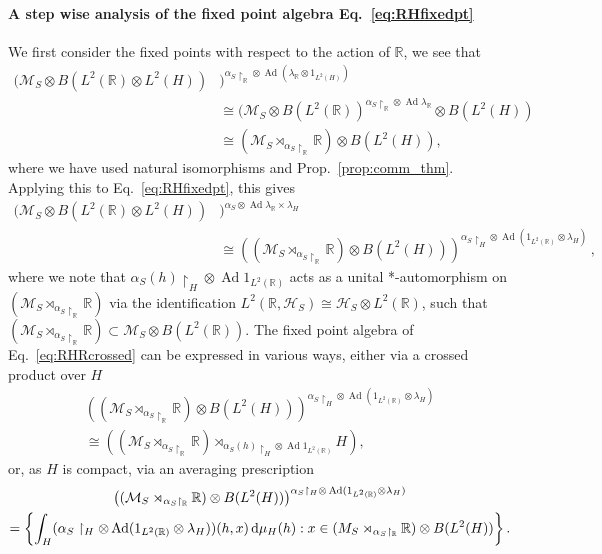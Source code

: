 \documentclass[sn-mathphys-num]{sn-jnl}%
\newcommand{\RR}{\mathbb{R}}
\newcommand{\HH}{\mathcal{H}}
\newcommand{\MM}{\mathcal{M}}
\DeclareMathOperator{\Ad}{Ad}
\newcommand{\diff}{\textup{d}}
\numberwithin{equation}{section}
\theoremstyle{thmstyleone}%
\theoremstyle{thmstyletwo}%
\theoremstyle{thmstylethree}%
\begin{document}
\paragraph{A step wise analysis of the fixed point algebra Eq.~\eqref{eq:RHfixedpt}} We first consider the fixed points with respect to the action of $\RR$, we see that
\begin{align}
    (\MM_S\otimes B(L^2(\RR)\otimes L^2(H))&)^{\alpha_S\restriction_{\RR}\otimes \Ad(\lambda_{\RR}\otimes 1_{L^2(H)})}\nonumber\\&\cong (\MM_S\otimes B(L^2(\RR))^{\alpha_S\restriction_{\RR}\otimes \Ad \lambda_\RR}\otimes B( L^2(H))\nonumber\\
    &\cong (\MM_S\rtimes_{\alpha_S\restriction_{\RR}} \RR)\otimes B( L^2(H)),
\end{align}
where we have used natural isomorphisms and Prop.\ \ref{prop:comm_thm}. Applying this to Eq.\ \eqref{eq:RHfixedpt}, this gives
\begin{align}
\label{eq:RHRcrossed}
    (\MM_S\otimes B(L^2(\RR)\otimes L^2(H))&)^{\alpha_S\otimes \Ad \lambda_\RR\times \lambda_H}\nonumber\\
    &\cong \left((\MM_S\rtimes_{\alpha_S\restriction_{\RR}} \RR)\otimes B( L^2(H))\right)^{\alpha_S\restriction_H\otimes \Ad(1_{L^2(\RR)}\otimes \lambda_H)}\,,
\end{align}
where we note that $\alpha_S(h)\restriction_H\otimes \Ad 1_{L^2(\RR)}$ acts as a unital *-automorphism on $(\MM_S\rtimes_{\alpha_S\restriction_{\RR}} \RR)$ via the identification $L^2(\RR,\HH_S)\cong \HH_S\otimes L^2(\RR)$, such that $(\MM_S\rtimes_{\alpha_S\restriction_{\RR}} \RR)\subset \MM_S\otimes B(L^2(\RR))$. The fixed point algebra of Eq.\ \eqref{eq:RHRcrossed} can be expressed in various ways, either via a crossed product over $H$
\begin{multline}
    \left((\MM_S\rtimes_{\alpha_S\restriction_{\RR}} \RR)\otimes B( L^2(H))\right)^{\alpha_S\restriction_H\otimes \Ad (1_{L^2(\RR)}\otimes \lambda_H)}\\
    \cong \left((\MM_S\rtimes_{\alpha_S\restriction_{\RR}} \RR)\rtimes_{\alpha_S(h)\restriction_H\otimes \Ad 1_{L^2(\RR)}}H\right),
\end{multline}
or, as $H$ is compact, via an averaging prescription
\begin{multline}
    \left((\MM_S\rtimes_{\alpha_S\restriction_{\RR}} \RR)\otimes B( L^2(H))\right)^{\alpha_S\restriction_H\otimes \Ad (1_{L^2(\RR)}\otimes \lambda_H)}\\=\left\{\int_H (\alpha_S\restriction_H\otimes\Ad(1_{L^2(\RR)}\otimes \lambda_H))(h,x)\,\diff\mu_H(h):x\in (M_S\rtimes_{\alpha_S\restriction_\RR}\RR)\otimes B(L^2(H))\right\}.
\end{multline}
\end{document}
